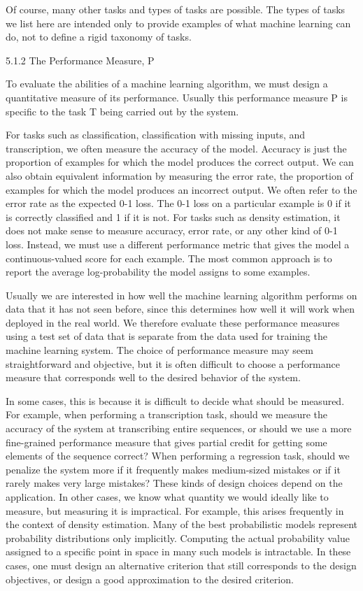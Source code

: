 \documentclass[11pt]{article}
\begin{document}
Of course, many other tasks and types of tasks are possible. The types of tasks
we list here are intended only to provide examples of what machine learning can
do, not to deﬁne a rigid taxonomy of tasks.

5.1.2 The Performance Measure, P

To evaluate the abilities of a machine learning algorithm, we must design a quantitative measure of its performance.
Usually this performance measure P is speciﬁc to the task T being carried out by the system.

For tasks such as classification, classification with missing inputs, and transcription, we often measure the accuracy of the model.
Accuracy is just the proportion of examples for which the model produces the correct output.
We can also obtain equivalent information by measuring the error rate, the proportion of examples for which the model produces an incorrect output.
We often refer to the error rate as the expected 0-1 loss.
The 0-1 loss on a particular example is 0 if it is correctly classiﬁed and 1 if it is not.
For tasks such as density estimation, it does not make sense to measure accuracy, error rate, or any other kind of 0-1 loss.
Instead, we must use a different performance metric that gives the model a continuous-valued score for each example.
The most common approach is to report the average log-probability the model assigns to some examples.

Usually we are interested in how well the machine learning algorithm performs
on data that it has not seen before, since this determines how well it will work when
deployed in the real world. We therefore evaluate these performance measures using
a
test set
of data that is separate from the data used for training the machine
learning system.
The choice of performance measure may seem straightforward and objective,
but it is often diﬃcult to choose a performance measure that corresponds well to
the desired behavior of the system.

In some cases, this is because it is diﬃcult to decide what should be measured.
For example, when performing a transcription task, should we measure the accuracy
of the system at transcribing entire sequences, or should we use a more ﬁne-grained
performance measure that gives partial credit for getting some elements of the
sequence correct? When performing a regression task, should we penalize the
system more if it frequently makes medium-sized mistakes or if it rarely makes
very large mistakes? These kinds of design choices depend on the application.
In other cases, we know what quantity we would ideally like to measure, but
measuring it is impractical. For example, this arises frequently in the context of
density estimation. Many of the best probabilistic models represent probability
distributions only implicitly. Computing the actual probability value assigned to
a speciﬁc point in space in many such models is intractable. In these cases, one
must design an alternative criterion that still corresponds to the design objectives,
or design a good approximation to the desired criterion.
\end{document}
